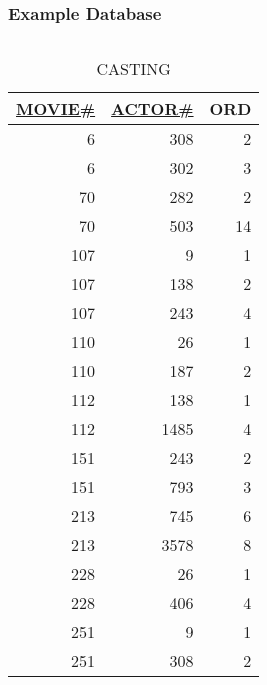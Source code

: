 \documentclass[dvipsnames]{beamer}
\theoremstyle{plain}
\begin{document}
\begin{frame}
  \frametitle{Example Database}

  \begin{columns}[b]
    \begin{tiny}
    \begin{table}
      \caption{CASTING}
      \begin{tabular}{|r|r|r|}\hline
\underline{MOVIE\#} & \underline{ACTOR\#} & ORD\\[2pt]\hline\hline
      6 &     308 &   2\\\hline
      6 &     302 &   3\\\hline
     70 &     282 &   2\\\hline
     70 &     503 &  14\\\hline
    107 &       9 &   1\\\hline
    107 &     138 &   2\\\hline
    107 &     243 &   4\\\hline
    110 &      26 &   1\\\hline
    110 &     187 &   2\\\hline
    112 &     138 &   1\\\hline
    112 &    1485 &   4\\\hline
    151 &     243 &   2\\\hline
    151 &     793 &   3\\\hline
    213 &     745 &   6\\\hline
    213 &    3578 &   8\\\hline
    228 &      26 &   1\\\hline
    228 &     406 &   4\\\hline
    251 &       9 &   1\\\hline
    251 &     308 &   2\\\hline
      \end{tabular}
    \end{table}
    \end{tiny}


\end{columns}
\end{frame}
\end{document}
